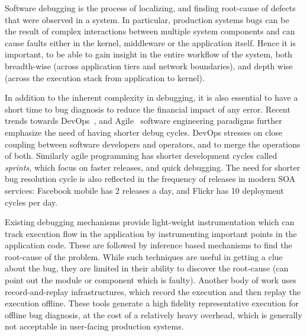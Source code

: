 Software debugging is the process of localizing, and finding root-cause of defects that were observed in a system.
In particular, production systems bugs can be the result of complex interactions between multiple system components and can cause faults either in the kernel, middleware or the application itself.
Hence it is important, to be able to gain insight in the entire workflow of the system, both breadth-wise (across application tiers and network boundaries), and depth wise (across the execution stack from application to kernel).

In addition to the inherent complexity in debugging, it is also essential to have a short time to bug diagnosis to reduce the financial impact of any error.
Recent trends towards DevOps~\cite{devops}, and Agile~\cite{agile} software engineering paradigms further emphasize the need of having shorter debug cycles.
DevOps stresses on close coupling between software developers and operators, and to merge the operations of both.
Similarly agile programming has shorter development cycles called \textit{sprints}, which focus on faster releases, and quick debugging.
The need for shorter bug resolution cycle is also reflected in the frequency of releases in modern SOA services: Facebook mobile has 2 releases a day, and Flickr has 10 deployment cycles per day.


Existing debugging mechanisms provide light-weight instrumentation which can track execution flow in the application by instrumenting important points in the application code.
These are followed by inference based mechanisms to find the root-cause of the problem.
While such techniques are useful in getting a clue about the bug, they are limited in their ability to discover the root-cause (can point out the module or component which is faulty).
Another body of work uses record-and-replay infrastructures, which record the execution and then replay the execution offline.
These tools generate a high fidelity representative execution for offline bug diagnosis, at the cost of a relatively heavy overhead, which is generally not acceptable in user-facing production systems.



